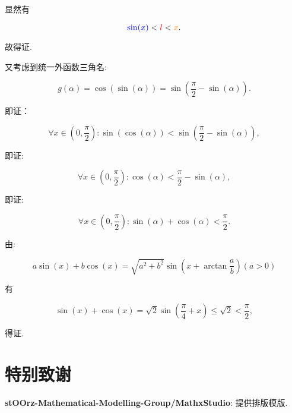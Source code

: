 \documentclass[8pt]{article}
\begin{document}
\begin{enumerate}[label=(\arabic*)]
			    	显然有

			    	$$\textcolor{blue}{\sin(x)}<\textcolor{red}{l}<\textcolor{orange}{x}.$$

			    	故得证.

			    	又考虑到统一外函数三角名:

			    	$$g(\alpha)=\cos(\sin(\alpha))=\sin\left(\dfrac{\pi}{2}-\sin(\alpha)\right).$$

			    	即证：

			    	$$\forall x\in \left(0, \frac{\pi}{2}\right): \sin(\cos(\alpha))<\sin\left(\dfrac{\pi}{2}-\sin(\alpha)\right),$$

			    	即证:

			    	$$\forall x\in \left(0, \frac{\pi}{2}\right): \cos(\alpha)<\dfrac{\pi}{2}-\sin(\alpha),$$

			    	即证:

			    	$$\forall x\in \left(0, \frac{\pi}{2}\right): \sin(\alpha)+\cos(\alpha)<\dfrac{\pi}{2}.$$

			    	由:

			    	$$a\sin(x)+b\cos(x)=\sqrt{a^2+b^2} \sin\left(x+\arctan \dfrac{a}{b}\right) (a>0)$$

			    	有

			    	$$\sin(x)+\cos(x)=\sqrt{2} \sin\left(\dfrac{\pi}{4}+x\right)\leq\sqrt{2}<\dfrac{\pi}{2},$$

			    	得证.

			\end{enumerate}

	\section{特别致谢}
		\textbf{\textcolor{allandarkblue}{stOOrz-Mathematical-Modelling-Group/MathxStudio}}: 提供排版模版.
\end{document}
